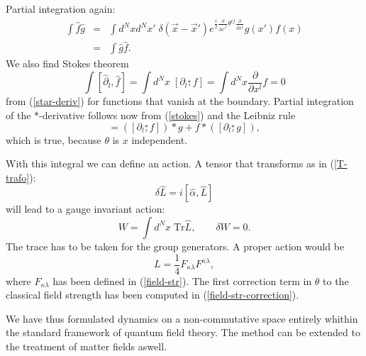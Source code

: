 \documentclass[a4paper,11pt]{article}
\def\nn{\nonumber }
\def\la{\lambda}
\def\ka{\kappa}
\def\ds{\stackrel{*}{,}}
\def\pat{\partial}
\begin{document}
Partial integration again:
\begin{eqnarray}
  \int \hat{f}\hat{g}&=&\int d^Nxd^Nx'\;\delta(\vec{x}-\vec{x}')e^{\frac{i}{2}\frac{\pat}{\pat x'^i}\theta^{ij}\frac{\pat}{\pat x^j}}g(x')f(x)\nn\\
  &=&\int \hat{g}\hat{f}.
\end{eqnarray}
We also find Stokes theorem
\begin{equation}
\label{stokes}
  \int [\hat{\pat}_l,\hat{f}]=\int d^Nx\;[\pat_l\ds f]=\int d^Nx\frac{\pat}{\pat x^l}f=0
\end{equation}
from (\ref{star-deriv}) for functions that vanish at the boundary. 
Partial integration of the $*$-derivative follows now from (\ref{stokes}) and the Leibniz rule 
\begin{equation}
  [\pat_l\ds (f*g)]=([\pat_l\ds f])*g+f*([\pat_l\ds g]),
\end{equation}
which is true, because $\theta$ is $x$ independent. 

With this integral we can define an action. A tensor that transforms as in (\ref{T-trafo}): 
\begin{equation}
  \delta\hat{L}=i[\hat{\alpha},\hat{L}]
\end{equation}
will lead to a gauge invariant action:
\begin{equation}
  W=\int d^Nx\; \mbox{Tr}\hat{L},\qquad \delta W=0.
\end{equation}
The trace has to be taken for the group generators. A proper action would be 
\begin{equation}
  L=\frac{1}{4}F_{\ka\la}F^{\ka\la},
\end{equation}
where $F_{\ka\la}$ has been defined in (\ref{field-str}). 
The first correction term in $\theta$ to the classical field strength has been 
computed in (\ref{field-str-correction}). 

We have thus formulated dynamics on a non-commutative space entirely whithin the
standard framework of quantum field theory. The method can be extended to the
treatment of matter fields aswell. 


\end{document}
